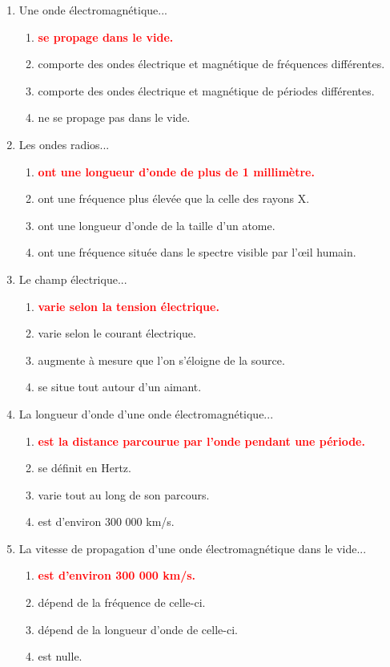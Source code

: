 \documentclass[a4paper]{article}
\begin{document}
\begin{enumerate}[label=Q\arabic*.]


\item Une onde électromagnétique...
\begin{enumerate}
    \item \textcolor{red}{\textbf{se propage dans le vide.}}
    \item comporte des ondes électrique et magnétique de fréquences différentes.
    \item comporte des ondes électrique et magnétique de périodes différentes.
    \item ne se propage pas dans le vide.
\end{enumerate}


\item Les ondes radios...
\begin{enumerate}
    \item \textcolor{red}{\textbf{ont une longueur d'onde de plus de 1 millimètre.}}
    \item ont une fréquence plus élevée que la celle des rayons X.
    \item ont une longueur d'onde de la taille d'un atome.
    \item ont une fréquence située dans le spectre visible par l’œil humain.
\end{enumerate}


\item Le champ électrique...
\begin{enumerate}
    \item \textcolor{red}{\textbf{varie selon la tension électrique.}}
    \item varie selon le courant électrique.
    \item augmente à mesure que l'on s'éloigne de la source.
    \item se situe tout autour d'un aimant.
\end{enumerate}


\item La longueur d'onde d'une onde électromagnétique...
\begin{enumerate}
    \item \textcolor{red}{\textbf{est la distance parcourue par l'onde pendant une période.}}
    \item se définit en Hertz.
    \item varie tout au long de son parcours.
    \item est d'environ 300 000 km/s.
\end{enumerate}


\item La vitesse de propagation d'une onde électromagnétique dans le vide...
\begin{enumerate}
    \item \textcolor{red}{\textbf{est d'environ 300 000 km/s.}}
    \item dépend de la fréquence de celle-ci.
    \item dépend de la longueur d'onde de celle-ci.
    \item est nulle.
\end{enumerate}


\end{enumerate}
\end{document}
